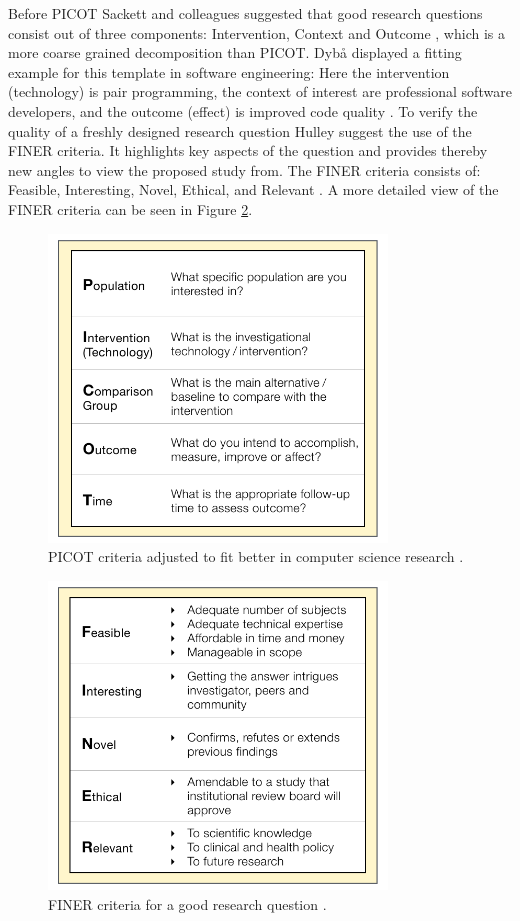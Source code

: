 Before PICOT Sackett and colleagues suggested that good research questions consist out of three components: Intervention, Context and Outcome \cite{Sackett2000}, which is a more coarse grained decomposition than PICOT. Dyb{\aa} \etal displayed a fitting example for this template in software engineering:  \cite[p. 60]{Dyba2005} Here the intervention (technology) is pair programming, the context of interest are professional software developers, and the outcome (effect) is improved code quality \cite{Dyba2005}. To verify the quality of a freshly designed research question Hulley \etal suggest the use of the FINER criteria. It highlights key aspects of the question and provides thereby new angles to view the proposed study from. The FINER criteria consists of: Feasible, Interesting, Novel, Ethical, and Relevant \cite{Farrugia2009}. A more detailed view of the FINER criteria can be seen in Figure \ref{fig:FINER}.   

\begin{figure}
	\centering
	\includegraphics[width=9cm]{figures/picot.pdf}
	\caption{PICOT criteria adjusted to fit better in computer science research \cite{Farrugia2009}.}
	\label{fig:PICOT}
\end{figure}

\begin{figure}
	\centering
	\includegraphics[width=9cm]{figures/finer.pdf}
	\caption{FINER criteria for a good research question \cite{Farrugia2009}.}
	\label{fig:FINER}
\end{figure}

